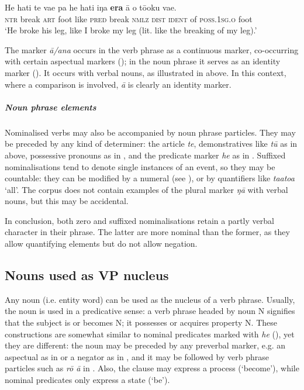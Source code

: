 \ea\label{ex:3.48a}
\gll He hati te va{\ꞌ}e pa he hati iŋa \textbf{era} {\ꞌ}ā o tō{\ꞌ}oku va{\ꞌ}e.\\
\textsc{ntr} break \textsc{art} foot like \textsc{pred} break \textsc{nmlz} \textsc{dist} \textsc{ident} of \textsc{poss.1sg.o} foot\\

\glt
‘He broke his leg, like I broke my leg (lit. like the breaking of my leg).’ \textstyleExampleref{[R492.021]}
\z

The marker \textit{{\ꞌ}ā}\textit{/{\ꞌ}ana} occurs in the verb phrase as a continuous marker, co-occurring with certain aspectual markers (); in the noun phrase it serves as an identity marker (). It occurs with verbal nouns, as illustrated in  above. In this context, where a comparison is involved, \textit{{\ꞌ}ā} is clearly an identity marker. 

\subparagraph{Noun phrase elements} Nominalised verbs may also be accompanied by noun phrase particles. They may be preceded by any kind of determiner: the article \textit{te}, demonstratives like \textit{tū} as in  above, possessive pronouns as in , and the predicate marker \textit{he} as in . Suffixed nominalisations tend to denote single instances of an event, so they may be countable: they can be modified by a numeral (see ), or by quantifiers like \textit{\mbox{ta{\ꞌ}ato{\ꞌ}a}} ‘all’. The corpus does not contain examples of the plural marker \textit{ŋā} with verbal nouns, but this may be accidental.

In conclusion, both zero and suffixed nominalisations retain a partly verbal character in their phrase. The latter are more nominal than the former, as they allow quantifying elements but do not allow negation.

\subsection{Nouns used as VP nucleus}\label{sec:3.2.4}
Any noun (i.e. entity word) can be used as the nucleus of a verb phrase. Usually, the noun is used in a predicative sense: a verb phrase headed by noun N signifies that the subject is or becomes N; it possesses or acquires property N. These constructions are somewhat similar to nominal predicates marked with \textit{he} (), yet they are different: the noun may be preceded by any preverbal marker, e.g. an aspectual as in  or a negator as in , and it may be followed by verb phrase particles such as \textit{rō {\ꞌ}ā} in . Also, the clause may express a process (‘become’), while nominal predicates only express a state (‘be’).

